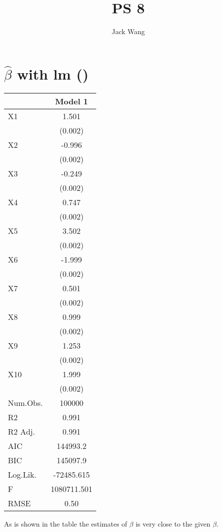\documentclass{article}
\title{PS 8}
\author{Jack Wang}
\begin{document}
\maketitle


\section{$\hat\beta$ with lm () }

\begin{table}[h!]
\centering
\begin{tabular}[t]{lc}
\toprule
  & Model 1\\
\midrule
X1 & 1.501\\
 & \vphantom{9} (0.002)\\
X2 & -0.996\\
 & \vphantom{8} (0.002)\\
X3 & -0.249\\
 & \vphantom{7} (0.002)\\
X4 & 0.747\\
 & \vphantom{6} (0.002)\\
X5 & 3.502\\
 & \vphantom{5} (0.002)\\
X6 & -1.999\\
 & \vphantom{4} (0.002)\\
X7 & 0.501\\
 & \vphantom{3} (0.002)\\
X8 & 0.999\\
 & \vphantom{2} (0.002)\\
X9 & 1.253\\
 & \vphantom{1} (0.002)\\
X10 & 1.999\\
 & (0.002)\\
\midrule
Num.Obs. & 100000\\
R2 & 0.991\\
R2 Adj. & 0.991\\
AIC & 144993.2\\
BIC & 145097.9\\
Log.Lik. & -72485.615\\
F & 1080711.501\\
RMSE & 0.50\\
\bottomrule
\end{tabular}
\end{table}

As is shown in the table the estimates of $ \beta $ is very close to the given $\beta$.
\end{document}
